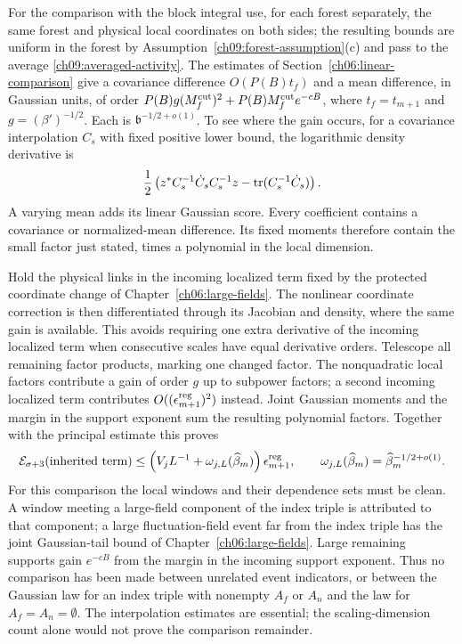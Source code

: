 For the comparison with the block integral use, for each forest separately, the same forest
and physical local coordinates on both sides; the resulting bounds are uniform in the forest by Assumption~\ref{ch09:forest-assumption}(c) and pass to the average \eqref{ch09:averaged-activity}. The estimates of
Section~\ref{ch06:linear-comparison} give a covariance difference
$O(P(B)t_f)$ and a mean difference, in Gaussian units, of order
$P(B)g(M_f^{\rm cut})^2+P(B)M_f^{\rm cut}e^{-cB}$,
where $t_f=t_{m+1}$ and $g=(\beta')^{-1/2}$. Each is
$\mathfrak b^{-1/2+o(1)}$. To see where the gain occurs, for
a covariance interpolation $C_s$ with fixed positive lower bound,
the logarithmic density derivative is
\[
 \frac12\left(z^*C_s^{-1}\dot C_s C_s^{-1}z
                      -\operatorname{tr}(C_s^{-1}\dot C_s)\right).
\]
A varying mean adds its linear Gaussian score. Every coefficient
contains a covariance or normalized-mean difference. Its fixed
moments therefore contain the small factor just stated, times a
polynomial in the local dimension.

Hold the physical links in the incoming localized term fixed by the
protected coordinate change of Chapter~\ref{ch06:large-fields}.
The nonlinear coordinate correction is then differentiated through
its Jacobian and density, where the same gain is available.
This avoids requiring one extra derivative of the incoming localized term
when consecutive scales have equal derivative orders. Telescope all
remaining factor products, marking one changed factor. The
nonquadratic local factors contribute a gain of order $g$ up to
subpower factors; a second incoming localized term contributes
$O((\epsilon_{m+1}^{\rm reg})^2)$ instead. Joint Gaussian moments
and the margin in the support exponent sum the resulting polynomial factors.
Together with the principal estimate this proves
\[
 \mathcal E_{\sigma+3}(\text{inherited term})
 \le \left(V_jL^{-1}+
       \omega_{j,L}(\widehat\beta_m)\right)
                    \epsilon_{m+1}^{\rm reg},
 \qquad
 \omega_{j,L}(\widehat\beta_m)
       =\widehat\beta_m^{-1/2+o(1)}.
\]
For this comparison the local windows and their dependence sets
must be clean. A window meeting a large-field component of the index triple is
attributed to that component; a large fluctuation-field event far from the index triple has the joint
Gaussian-tail bound of Chapter~\ref{ch06:large-fields}. Large
remaining supports gain $e^{-cB}$ from the margin in the incoming support
exponent. Thus no comparison has been made between unrelated event indicators, or between the Gaussian law for an index triple with nonempty $A_f$ or $A_n$ and
the law for $A_f=A_n=\emptyset$. The interpolation estimates
are essential; the scaling-dimension count alone would not prove
the comparison remainder.

